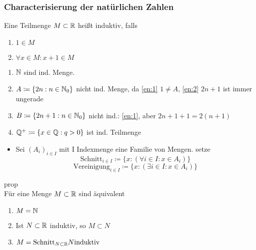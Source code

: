 \documentclass[consecutivenumbering]{gadsescript}
\begin{document}
\subsubsection{Characterisierung der natürlichen Zahlen}
\begin{subdefinition}
	Eine Teilmenge $ M \subset \mathbb{R} $ heißt induktiv, falls
	\begin{enumerate}[label=(\roman*)]
		\item \label{en:1}$ 1 \in M $
		\item \label{en:2}$ \forall x \in M : x + 1 \in M $
	\end{enumerate}
	\begin{subexample}
		\begin{enumerate}[label=(\alph*)]
			\item $ \mathbb{N} $ sind ind. Menge.
			\item $ A \coloneqq \{ 2n : n \in \mathbb{N}_0 \} $ nicht ind. Menge, da \ref{en:1} $ 1 \neq A $, \ref{en:2} $2n + 1 $ ist immer ungerade
			\item $ B \coloneqq \{ 2n + 1 : n \in \mathbb{N}_0 \} $ nicht ind.: \ref{en:1}, aber $ 2n + 1 + 1 = 2 (n+1) $
			\item $\mathbb{Q}^+ \coloneqq \{ x \in \mathbb{Q}: q > 0 \} $ ist ind. Teilmenge
		\end{enumerate}
	\end{subexample}
\end{subdefinition}
\begin{itemize}
	\item Sei $ (A_i)_{i\in I} $ mit I Indexmenge eine Familie von Mengen. setze
		\[ \text{Schnitt}_{i\in I} \coloneqq \{ x : (\forall i \in I: x \in A_i ) \} \]
		\[ \text{Vereinigung}_{i\in I} \coloneqq \{ x : ( \exists i \in I: x \in A_i ) \} \]
\end{itemize}

prop\\
Für eine Menge $ M \subset \mathbb{R} $ sind äquivalent
\begin{enumerate}[label=(\roman*)]
	\item \label{en:4}$ M = \mathbb{N} $
	\item \label{en:5}Ist $ N \subset \mathbb{R} $ induktiv, so $ M \subset N $
	\item \label{en:6}$ M = \text{Schnitt}_{N\subset\mathbb{R}} N \text{induktiv} $
\end{enumerate}
\end{document}
